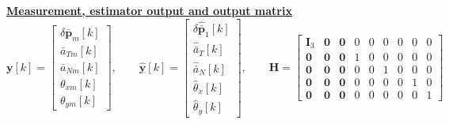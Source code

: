 \documentclass[11pt,a4paper]{ctexart}
\newcommand{\hd}[1]{\par\bigskip\noindent\underline{\textbf{#1}}}
\newcommand{\dpb}{\delta\bar{\mathbf p}}
\newcommand{\dph}{\delta\hat{\bar{\mathbf p}}}
\newcommand{\haT}{\hat{\bar a}_T}
\newcommand{\haN}{\hat{\bar a}_N}
\newcommand{\I}{\mathbf I}
\begin{document}
\hd{Measurement, estimator output and output matrix}
\[
\mathbf y[k] = \begin{bmatrix} \dpb_m[k] \\ \bar a_{Tm}[k] \\ \bar a_{Nm}[k] \\ \theta_{xm}[k] \\ \theta_{ym}[k] \end{bmatrix},
\qquad
\hat{\mathbf y}[k] = \begin{bmatrix} \dph_1[k] \\ \haT[k] \\ \haN[k] \\ \hat\theta_x[k] \\ \hat\theta_y[k] \end{bmatrix},
\qquad
\mathbf H =
\begin{bmatrix}
\I_3 & \mathbf 0 & \mathbf 0 & 0 & 0 & 0 & 0 & 0 & 0 \\
\mathbf 0 & \mathbf 0 & \mathbf 0 & 1 & 0 & 0 & 0 & 0 & 0 \\
\mathbf 0 & \mathbf 0 & \mathbf 0 & 0 & 0 & 1 & 0 & 0 & 0 \\
\mathbf 0 & \mathbf 0 & \mathbf 0 & 0 & 0 & 0 & 0 & 1 & 0 \\
\mathbf 0 & \mathbf 0 & \mathbf 0 & 0 & 0 & 0 & 0 & 0 & 1
\end{bmatrix}
\]

\clearpage
\end{document}
